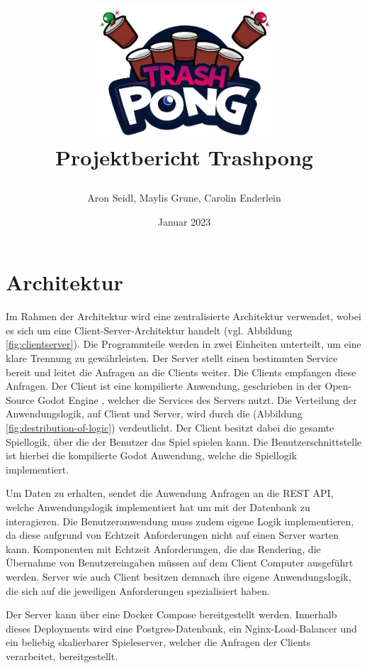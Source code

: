\documentclass[
]{article}
\title{
  \begin{center}
    \includegraphics[width=0.5\textwidth]{resources/header.png} \\
    Projektbericht Trashpong
  \end{center}
}
\author{Aron Seidl, Maylis Grune, Carolin Enderlein}
\date{Januar 2023}
\begin{document}
\maketitle

\hypertarget{section-introduction-and-goals}{%
\section{Architektur}\label{section-introduction-and-goals}}

Im Rahmen der Architektur wird eine zentralisierte Architektur verwendet, wobei es sich um eine Client-Server-Architektur handelt (vgl. Abbildung \ref{fig:clientserver}).
Die Programmteile werden in zwei Einheiten unterteilt, um eine klare Trennung zu gewährleisten. 
Der Server stellt einen bestimmten Service bereit und leitet die Anfragen an die Clients weiter. 
Die Clients empfangen diese Anfragen.\cite{tanenbaum2007distributed}
Der Client ist eine kompilierte Anwendung, geschrieben in der Open-Source Godot Engine \cite{godot}, welcher die
Services des Servers nutzt. 
Die Verteilung der Anwendungslogik, auf Client und Server, wird durch die (Abbildung \ref{fig:destribution-of-logic}) verdeutlicht.
Der Client besitzt dabei die gesamte Spiellogik, über die der Benutzer das Spiel spielen kann. 
Die Benutzerschnittstelle ist hierbei die kompilierte Godot Anwendung, welche die Spiellogik implementiert.

Um Daten zu erhalten, sendet die Anwendung Anfragen an die REST API, welche Anwendungslogik implementiert hat um mit der Datenbank zu interagieren.
Die Benutzeranwendung muss zudem eigene Logik implementieren, da diese aufgrund von Echtzeit Anforderungen nicht auf einen Server warten kann.
Komponenten mit Echtzeit Anforderungen, die das  Rendering, die Übernahme von Benutzereingaben müssen auf dem Client Computer ausgeführt werden.
Server wie auch Client besitzen demnach ihre eigene Anwendungslogik, die sich auf die jeweiligen Anforderungen spezialisiert haben.

Der Server kann über eine Docker Compose bereitgestellt werden.
Innerhalb dieses Deployments wird eine Postgres-Datenbank, 
ein Nginx-Load-Balancer und ein beliebig skalierbarer Spieleserver, welcher die Anfragen der Clients verarbeitet, bereitgestellt.
\end{document}
